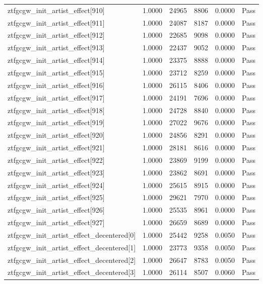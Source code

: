 \begin{table}[htbp]
\begin{tabular}{llrrll}
ztfgcgw\_init\_artist\_effect[910] & 1.0000 & 24965 & 8806 & 0.0000 & Pass \\
ztfgcgw\_init\_artist\_effect[911] & 1.0000 & 24087 & 8187 & 0.0000 & Pass \\
ztfgcgw\_init\_artist\_effect[912] & 1.0000 & 22685 & 9098 & 0.0000 & Pass \\
ztfgcgw\_init\_artist\_effect[913] & 1.0000 & 22437 & 9052 & 0.0000 & Pass \\
ztfgcgw\_init\_artist\_effect[914] & 1.0000 & 23375 & 8888 & 0.0000 & Pass \\
ztfgcgw\_init\_artist\_effect[915] & 1.0000 & 23712 & 8259 & 0.0000 & Pass \\
ztfgcgw\_init\_artist\_effect[916] & 1.0000 & 26115 & 8406 & 0.0000 & Pass \\
ztfgcgw\_init\_artist\_effect[917] & 1.0000 & 24191 & 7696 & 0.0000 & Pass \\
ztfgcgw\_init\_artist\_effect[918] & 1.0000 & 24728 & 8840 & 0.0000 & Pass \\
ztfgcgw\_init\_artist\_effect[919] & 1.0000 & 27022 & 9676 & 0.0000 & Pass \\
ztfgcgw\_init\_artist\_effect[920] & 1.0000 & 24856 & 8291 & 0.0000 & Pass \\
ztfgcgw\_init\_artist\_effect[921] & 1.0000 & 28181 & 8616 & 0.0000 & Pass \\
ztfgcgw\_init\_artist\_effect[922] & 1.0000 & 23869 & 9199 & 0.0000 & Pass \\
ztfgcgw\_init\_artist\_effect[923] & 1.0000 & 23862 & 8691 & 0.0000 & Pass \\
ztfgcgw\_init\_artist\_effect[924] & 1.0000 & 25615 & 8915 & 0.0000 & Pass \\
ztfgcgw\_init\_artist\_effect[925] & 1.0000 & 29621 & 7970 & 0.0000 & Pass \\
ztfgcgw\_init\_artist\_effect[926] & 1.0000 & 25535 & 8961 & 0.0000 & Pass \\
ztfgcgw\_init\_artist\_effect[927] & 1.0000 & 26659 & 8689 & 0.0000 & Pass \\
ztfgcgw\_init\_artist\_effect\_decentered[0] & 1.0000 & 25442 & 9258 & 0.0050 & Pass \\
ztfgcgw\_init\_artist\_effect\_decentered[1] & 1.0000 & 23773 & 9358 & 0.0050 & Pass \\
ztfgcgw\_init\_artist\_effect\_decentered[2] & 1.0000 & 26647 & 8783 & 0.0050 & Pass \\
ztfgcgw\_init\_artist\_effect\_decentered[3] & 1.0000 & 26114 & 8507 & 0.0060 & Pass \\

\end{tabular}
\end{table}
